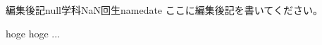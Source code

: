 \documentclass[10pt,b5paper,papersize,dvipdfmx]{jsbook}
\begin{document}
\begin{preface}{編集後記}{null学科NaN回生}{name}{date}
  ここに編集後記を書いてください。\par
  hoge hoge ...
\end{preface}
\end{document}
